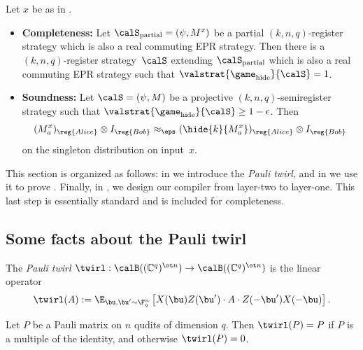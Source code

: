 \begin{theorem}\label{thm:data-hiding-game}
Let $x$ be as in .
\begin{itemize}
\item[$\circ$] \textbf{Completeness:}
Let $\calS_{\mathrm{partial}} = (\psi, M^x)$ be a partial $(k,n,q)$-register strategy
			which is also a real commuting EPR strategy.
			Then there is a $(k,n,q)$-register
                        strategy~$\calS$ extending
                        $\calS_{\mathrm{partial}}$ which is also a
                        real commuting EPR strategy
			such that $\valstrat{\game_{\mathrm{hide}}}{\calS} = 1$.
\item[$\circ$] \textbf{Soundness:} 
Let $\calS = (\psi, M)$ be a projective $(k, n, q)$-semiregister strategy such that $\valstrat{\game_{\mathrm{hide}}}{\calS} \geq 1-\epsilon$. Then
\begin{equation*}
(M_a^x)_{\reg{Alice}} \otimes I_{\reg{Bob}} \approx_\eps (\hide{k}{M_a^x})_{\reg{Alice}} \otimes I_{\reg{Bob}}
\end{equation*}
on the singleton distribution on input~$x$.
\end{itemize}
\end{theorem}

This section is organized as follows:
in  we introduce the \emph{Pauli twirl},
and in  we use it to prove .
Finally, in , we design our compiler from layer-two to layer-one.
This last step is essentially standard and is included for completeness.

\subsection{Some facts about the Pauli twirl}\label{sec:pauli-twirl}

\newcommand{\push}{\nu}
\newcommand{\bpush}{\bnu}
\newcommand{\twirlset}{S_{\mathrm{twirl}}}
\newcommand{\twirldist}{\calD_{\mathrm{twirl}}}

\begin{definition}
  The \emph{Pauli twirl} $\twirl: \calB((\mathbb{C}^q)^{\ot n})
  \to \calB((\mathbb{C}^q)^{\ot n})$ is the linear operator
  \[ \twirl(A) := \E_{\bu, \bu' \sim \F_q^n}\left[
      X(\bu) Z(\bu') \cdot A \cdot Z(-\bu') X(-\bu) \right]. \]
\end{definition}

\begin{proposition}\label{claim:twirled_pauli}
  Let $P$ be a Pauli matrix on $n$ qudits of dimension $q$. Then
$
\twirl(P) =  P
$
if $P$ is a multiple of the identity,
and otherwise $\twirl(P) = 0$.
\end{proposition}

